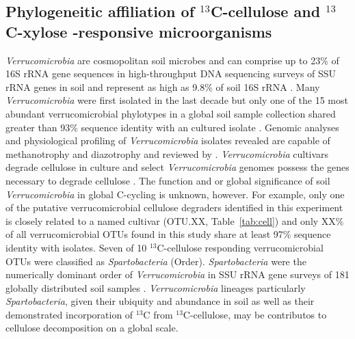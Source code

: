 \subsection{Phylogeneitic affiliation of $^{13}$C-cellulose and $^{13}$C-xylose -responsive microorganisms}
\textit{Verrucomicrobia} are cosmopolitan soil microbes \citep{Bergmann_2011}
and can comprise up to 23\%
of 16S rRNA gene sequences in high-throughput DNA sequencing surveys of
SSU rRNA genes in soil \citep{Bergmann_2011} and represent as high as
9.8\% of soil 16S rRNA \citep{Buckley_2001}. Many \textit{Verrucomicrobia}
were first isolated in the last decade \cite{Wertz_2011} but
only one of the 15 most abundant verrucomicrobial phylotypes in a global
soil sample collection shared greater than 93\% sequence identity with an
cultured isolate \citep{Bergmann_2011}. Genomic analyses and physiological
profiling of \textit{Verrucomicrobia} isolates revealed 
are capable of methanotrophy and
diazotrophy \citep{Wertz_2011} and
reviewed by \citet{Wertz_2011}. \textit{Verrucomicrobia} cultivars
degrade cellulose in culture and select \textit{Verrucomicrobia} genomes possess
the genes necessary to degrade cellulose \citep{Otsuka_2012, Wertz_2011}.
The function and or global
significance of soil \textit{Verrucomicrobia} in global C-cycling is
unknown, however. For example, only one of the putative verrucomicrobial cellulose
degraders identified in this experiment is closely related to a named
cultivar (OTU.XX, Table~\ref{tab:cell}) and only XX\% of all
verrucomicrobial OTUs found in this study share at least 97\% sequence
identity with isolates. Seven of 10 $^{13}$C-cellulose responding
verrucomicrobial OTUs were classified as \textit{Spartobacteria} (Order).
\textit{Spartobacteria} were the numerically dominant order
of \textit{Verrucomicrobia} in SSU rRNA gene surveys of 181 globally
distributed soil samples \citep{Bergmann_2011}. \textit{Verrucomicrobia}
lineages particularly \textit{Spartobacteria}, given their ubiquity and
abundance in soil as well as their demonstrated incorporation of $^{13}$C from
$^{13}$C-cellulose, may be contributos to cellulose decomposition on a 
global scale.

